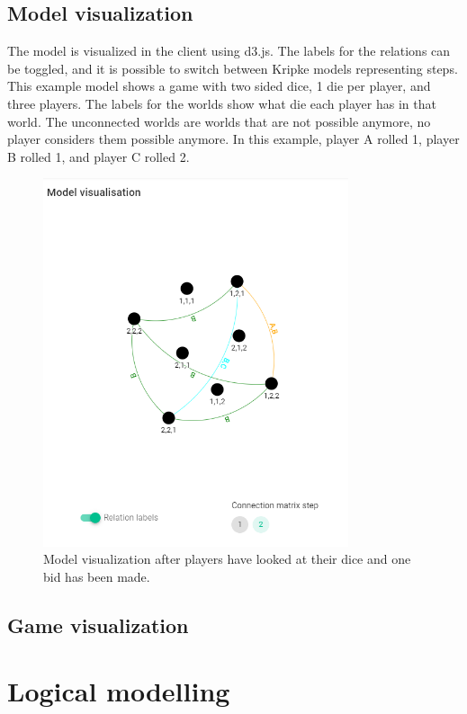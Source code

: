 \documentclass{article}
\begin{document}
\subsection*{Model visualization} %
The model is visualized in the client using d3.js. The labels for the relations can be toggled, and it is possible to switch between Kripke models representing steps. This example model shows a game with two sided dice, 1 die per player, and three players. The labels for the worlds show what die each player has in that world. The unconnected worlds are worlds that are not possible anymore, no player considers them possible anymore. In this example, player A rolled 1, player B rolled 1, and player C rolled 2.
\begin{figure}[h]
    \includegraphics[width=0.8\textwidth]{img/visualization.png}
    \centering
    \caption{Model visualization after players have looked at their dice and one bid has been made.}
    \label{fig:liarsdice}
\end{figure}
\subsection*{Game visualization}%

\section*{Logical modelling}
\end{document}
